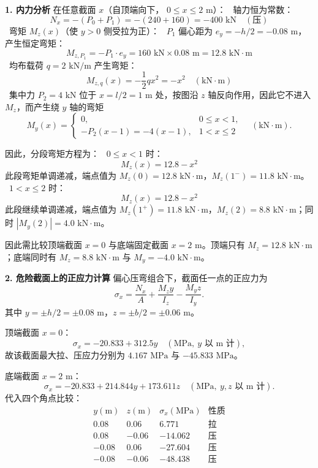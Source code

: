 \documentclass[11pt,a4paper]{ctexrep}
\begin{document}
{\textbf{1. 内力分析}
在任意截面 $x$（自顶端向下， $0 \le x \le 2\text{ m}$）：
\noindent\textbullet\ 轴力恒为常数：
  \[
  N_x = -(P_0 + P_1) = -(240 + 160) = -400\text{ kN} \quad (\text{压})
  \]
\noindent\textbullet\ 弯矩 $M_z(x)$（使 $y > 0$ 侧受拉为正）：
\noindent\textbullet\ $P_1$ 偏心距为 $e_y = -h/2 = -0.08\text{ m}$，产生恒定弯矩：
    \[
    M_{z, P_1} = -P_1 \cdot e_y = 160\text{ kN} \times 0.08\text{ m} = 12.8\text{ kN}\cdot\text{m}
    \]
\noindent\textbullet\ 均布载荷 $q = 2\text{ kN/m}$ 产生弯矩：
    \[
    M_{z, q}(x) = -\frac{1}{2} q x^2 = -x^2 \quad (\text{kN}\cdot\text{m})
    \]
\noindent\textbullet\ 集中力 $P_2 = 4\text{ kN}$ 位于 $x=l/2=1\text{ m}$ 处，按图沿 $z$ 轴反向作用，因此它不进入 $M_z$，而产生绕 $y$ 轴的弯矩
\[
M_y(x)=
\begin{cases}
0, & 0\le x<1,\\
-P_2(x-1)=-4(x-1), & 1<x\le 2
\end{cases}
\quad(\text{kN}\cdot\text{m}).
\]

因此，分段弯矩方程为：
\noindent\textbullet\ $0 \le x < 1$ 时：
  \[
  M_z(x) = 12.8 - x^2
  \]
  此段弯矩单调递减，端点值为 $M_z(0) = 12.8\text{ kN}\cdot\text{m}$，$M_z(1^-) = 11.8\text{ kN}\cdot\text{m}$。
\noindent\textbullet\ $1 < x \le 2$ 时：
  \[
  M_z(x) = 12.8 - x^2
  \]
  此段继续单调递减，端点值为 $M_z(1^+) = 11.8\text{ kN}\cdot\text{m}$，$M_z(2) = 8.8\text{ kN}\cdot\text{m}$；同时 $|M_y(2)|=4.0\text{ kN}\cdot\text{m}$。

因此需比较顶端截面 $x=0$ 与底端固定截面 $x=2\text{ m}$。顶端只有 $M_z=12.8\text{ kN}\cdot\text{m}$；底端同时有 $M_z=8.8\text{ kN}\cdot\text{m}$ 与 $M_y=-4.0\text{ kN}\cdot\text{m}$。

\textbf{2. 危险截面上的正应力计算}
偏心压弯组合下，截面任一点的正应力为
\[
\sigma_x = \frac{N_x}{A}+\frac{M_z y}{I_z}-\frac{M_y z}{I_y}.
\]
其中 $y=\pm h/2=\pm0.08\text{ m}$，$z=\pm b/2=\pm0.06\text{ m}$。

顶端截面 $x=0$：
\[
\sigma_x=-20.833+312.5y\quad(\text{MPa},\ y\text{ 以 m 计}),
\]
故该截面最大拉、压应力分别为 $4.167\text{ MPa}$ 与 $-45.833\text{ MPa}$。

底端截面 $x=2\text{ m}$：
\[
\sigma_x=-20.833+214.844y+173.611z\quad(\text{MPa},\ y,z\text{ 以 m 计}).
\]
代入四个角点比较：
\[
\begin{array}{c|c|c|c}
y(\text{m}) & z(\text{m}) & \sigma_x(\text{MPa}) & \text{性质}\\
\hline
0.08 & 0.06 & 6.771 & \text{拉}\\
0.08 & -0.06 & -14.062 & \text{压}\\
-0.08 & 0.06 & -27.604 & \text{压}\\
-0.08 & -0.06 & -48.438 & \text{压}
\end{array}
\]

}
\end{document}
